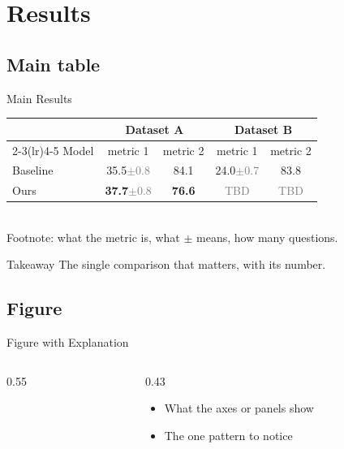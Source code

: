 \documentclass[aspectratio=169,10pt]{beamer}
\newcommand{\tbd}{\textcolor{gray}{TBD}}                            %
\newcommand{\sd}[1]{{\scriptsize\textcolor{gray}{$\pm$#1}}}         %
\newenvironment{takeaway}{\begin{exampleblock}{Takeaway}}{\end{exampleblock}}   %
\begin{document}
\section{Results}

\subsection{Main table}
\begin{frame}{Main Results}
  \centering\small
  \begin{tabular}{@{}lcccc@{}}
    \toprule
    & \multicolumn{2}{c}{Dataset A} & \multicolumn{2}{c}{Dataset B} \\
    \cmidrule(lr){2-3}\cmidrule(lr){4-5}
    Model & metric 1 & metric 2 & metric 1 & metric 2 \\
    \midrule
    Baseline & 35.5\sd{0.8} & 84.1 & 24.0\sd{0.7} & 83.8 \\
    Ours & \textbf{37.7}\sd{0.8} & \textbf{76.6} & \tbd & \tbd \\
    \bottomrule
  \end{tabular}\\[2pt]
  {\scriptsize Footnote: what the metric is, what $\pm$ means, how many questions.}
  \begin{takeaway}
    The single comparison that matters, with its number.
  \end{takeaway}
\end{frame}

\subsection{Figure}
\begin{frame}{Figure with Explanation}
  \begin{columns}[T]
    \begin{column}{0.55\textwidth}
      \centering
    \end{column}
    \begin{column}{0.43\textwidth}
      \small
      \begin{itemize}
        \item What the axes or panels show
        \item The one pattern to notice
      \end{itemize}
    \end{column}
  \end{columns}
\end{frame}
\end{document}
